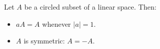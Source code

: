 Let $A$ be a circled subset of a linear space. Then:
\begin{itemize}
\item $aA = A$ whenever $|a| = 1$.
\item $A$ is symmetric: $A = -A$.
\end{itemize}
